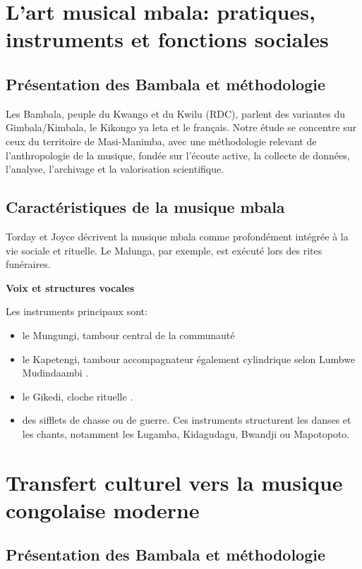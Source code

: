 \documentclass[final,fra]{anthology-ch}         %
\begin{document}
\section{L'art musical mbala: pratiques, instruments et fonctions sociales}

\subsection{Présentation des Bambala et méthodologie}

Les Bambala, peuple du Kwango et du Kwilu (RDC), parlent des variantes du Gimbala/Kimbala, le Kikongo ya leta et le français. Notre étude se concentre sur ceux du territoire de Masi-Manimba, avec une méthodologie relevant de l'anthropologie de la musique, fondée sur l'écoute active, la collecte de données, l'analyse, l'archivage et la valorisation scientifique.

\subsection{Caractéristiques de la musique mbala}

Torday et Joyce \cite{torday1905notes} décrivent la musique mbala comme profondément intégrée à la vie sociale et rituelle. Le Malunga, par exemple, est exécuté lors des rites funéraires.

\textbf{Voix et structures vocales}

Les instruments principaux sont:

\begin{itemize}
    \item le Mungungi, tambour central de la communauté \cite{mudindaambi1976objets}
    \item le Kapetengi, tambour accompagnateur également cylindrique selon Lumbwe Mudindaambi \cite{mudindaambi1976objets}.
    \item le Gikedi, cloche rituelle \cite{mudindaambi1976objets}.
    \item des sifflets de chasse ou de guerre. Ces instruments structurent les danses et les chants, notamment les Lugamba, Kidagudagu, Bwandji ou Mapotopoto.
\end{itemize}

\section{Transfert culturel vers la musique congolaise moderne}

\subsection{Présentation des Bambala et méthodologie}
\end{document}
